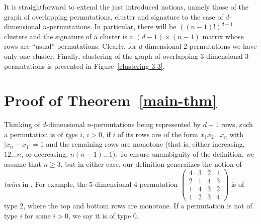 \documentclass[12pt]{article}
\begin{document}
It is straightforward to extend the just introduced notions, namely those of the graph of overlapping permutations, cluster and signature to the case of $d$-dimensional $n$-permutations. In particular, there will be $((n-1)!)^{d-1}$ clusters and the signature of a cluster is a $(d-1)\times (n-1)$ matrix whose rows are ``usual'' permutations. Clearly, for $d$-dimensional 2-permutations we have only one cluster. Finally, clustering of the graph of overlapping 3-dimensional 3-permutations is presented in Figure~\ref{clustering-3-3}.

\section{Proof of Theorem~\ref{main-thm}}\label{proof-sec}

Thinking of $d$-dimensional $n$-permutations being represented by $d-1$ rows, such a permutation is of {\em type $i$}, $i>0$, if $i$ of its rows are of the form $x_1x_2\ldots x_n$ with $|x_n-x_1|=1$ and the remaining rows are monotone (that is, either increasing, $12\ldots n$, or decreasing, $n(n-1)\ldots 1$). To ensure  unambiguity of the definition, we assume that $n\geq 3$, but in either case, our definition generalizes the notion of {\em twins} in \cite{KPV}. For example, the 5-dimensional 4-permutation {\footnotesize $\left(\begin{array}{cccc} 4 & 3 & 2 & 1  \\ 2 & 1 & 4 & 3  \\ 1 & 4 & 3 & 2 \\ 1 & 2 & 3 & 4  \end{array}\right)$} is of type 2, where the top and bottom rows are monotone. If a permutation is not of type $i$ for some $i>0$, we say it is of type $0$.
\end{document}

